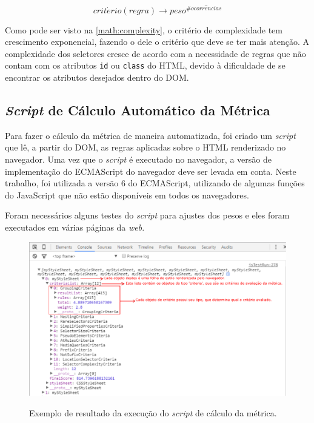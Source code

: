 \begin{equation}
\label{math:complexity}
	crit\acute{e}rio(regra) \rightarrow peso^{\#ocorr\hat{e}ncias}
\end{equation}

Como pode ser visto na \autoref{math:complexity}, o critério de complexidade tem crescimento exponencial, fazendo o dele o critério que deve se ter mais atenção. A complexidade dos seletores cresce de acordo com a necessidade de regras que não contam com os atributos \texttt{id} ou \texttt{class} do HTML, devido à dificuldade de se encontrar os atributos desejados dentro do DOM.

\subsection{\textit{Script} de Cálculo Automático da Métrica}

Para fazer o cálculo da métrica de maneira automatizada, foi criado um \textit{script} que lê, a partir do DOM, as regras aplicadas sobre o HTML renderizado no navegador. Uma vez que o \textit{script} é executado no navegador, a versão de implementação do ECMAScript do navegador deve ser levada em conta. Neste trabalho, foi utilizada a versão 6 do ECMAScript, utilizando de algumas funções do JavaScript que não estão disponíveis em todos os navegadores.

Foram necessários alguns testes do \textit{script} para ajustes dos pesos e eles foram executados em várias páginas da \textit{web}.

\begin{figure}[!htb]
	\centering
	\caption{Exemplo de resultado da execução do \textit{script} de cálculo da métrica.}
	\includegraphics[width=1\textwidth]{./04-figuras/calculator}
	\label{fig:calculatorTest}
\end{figure}

